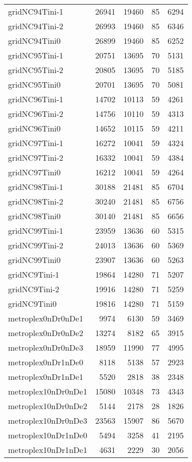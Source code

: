 \begin{tabular}{lrrrr}
gridNC94Tini-1 & 26941 & 19460 & 85 & 6294 \\
gridNC94Tini-2 & 26993 & 19460 & 85 & 6346 \\
gridNC94Tini0 & 26899 & 19460 & 85 & 6252 \\
gridNC95Tini-1 & 20751 & 13695 & 70 & 5131 \\
gridNC95Tini-2 & 20805 & 13695 & 70 & 5185 \\
gridNC95Tini0 & 20701 & 13695 & 70 & 5081 \\
gridNC96Tini-1 & 14702 & 10113 & 59 & 4261 \\
gridNC96Tini-2 & 14756 & 10110 & 59 & 4313 \\
gridNC96Tini0 & 14652 & 10115 & 59 & 4211 \\
gridNC97Tini-1 & 16272 & 10041 & 59 & 4324 \\
gridNC97Tini-2 & 16332 & 10041 & 59 & 4384 \\
gridNC97Tini0 & 16212 & 10041 & 59 & 4264 \\
gridNC98Tini-1 & 30188 & 21481 & 85 & 6704 \\
gridNC98Tini-2 & 30240 & 21481 & 85 & 6756 \\
gridNC98Tini0 & 30140 & 21481 & 85 & 6656 \\
gridNC99Tini-1 & 23959 & 13636 & 60 & 5315 \\
gridNC99Tini-2 & 24013 & 13636 & 60 & 5369 \\
gridNC99Tini0 & 23907 & 13636 & 60 & 5263 \\
gridNC9Tini-1 & 19864 & 14280 & 71 & 5207 \\
gridNC9Tini-2 & 19916 & 14280 & 71 & 5259 \\
gridNC9Tini0 & 19816 & 14280 & 71 & 5159 \\
metroplex0nDr0nDe1 & 9974 & 6130 & 59 & 3469 \\
metroplex0nDr0nDe2 & 13274 & 8182 & 65 & 3915 \\
metroplex0nDr0nDe3 & 18959 & 11990 & 77 & 4995 \\
metroplex0nDr1nDe0 & 8118 & 5138 & 57 & 2923 \\
metroplex0nDr1nDe1 & 5520 & 2818 & 38 & 2348 \\
metroplex10nDr0nDe1 & 15080 & 10348 & 73 & 4343 \\
metroplex10nDr0nDe2 & 5144 & 2178 & 28 & 1826 \\
metroplex10nDr0nDe3 & 23563 & 15907 & 86 & 5670 \\
metroplex10nDr1nDe0 & 5494 & 3258 & 41 & 2195 \\
metroplex10nDr1nDe1 & 4631 & 2229 & 30 & 2056 \\

\end{tabular}
